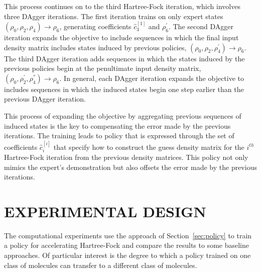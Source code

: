\documentclass[twoside,11pt]{article}
\begin{document}
This process continues on to the third Hartree-Fock iteration, which involves three DAgger iterations. The first iteration trains on only expert states $(\rho_0, \rho_2, \rho_4) \rightarrow \rho_6$, generating coefficients $\hat{c}^{[1]}_3$ and $\rho_6^{'}$. The second DAgger iteration expands the objective to include sequences in which the final input density matrix includes states induced by previous policies, $(\rho_0, \rho_2, \rho_4^{'}) \rightarrow \rho_6$. The third DAgger iteration adds sequences in which the states induced by the previous policies begin at the penultimate input density matrix,  $(\rho_0, \rho_2^{'}, \rho_{4}^{''}) \rightarrow \rho_6$. In general, each DAgger iteration expands the objective to includes sequences in which the induced states begin one step earlier than the previous DAgger iteration.  

This process of expanding the objective by aggregating previous sequences of induced states is the key to compensating the error made by the previous iterations. The training leads to policy that is expressed through the set of coefficients $\hat{c}^{[i]}_i$ that specify how to construct the guess density matrix for the $i^{th}$ Hartree-Fock iteration from the previous density matrices. This policy not only mimics the expert's demonstration but also offsets the error made by the previous iterations.

\section{EXPERIMENTAL DESIGN}

The computational experiments use the approach of Section~\ref{sec:policy} to train a policy for accelerating Hartree-Fock and compare the results to some baseline approaches. Of particular interest is the degree to which a policy trained on one class of molecules can transfer to a different class of molecules. 
\end{document}
